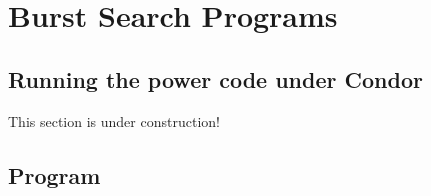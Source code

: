 
\chapter{Burst Search Programs}
\label{chapter:powertools}

 
\clearpage
\section{Running the power code under Condor}
\label{subsection:running_power}

This section is under construction!


\clearpage
\section{Program }
\label{program:lalapps-power-pipe}

